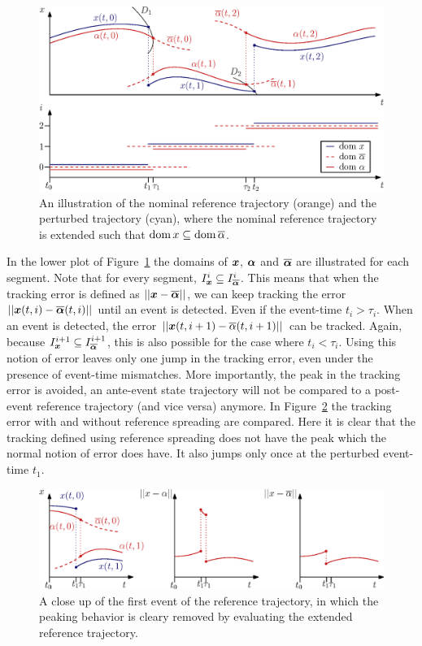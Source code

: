 \documentclass[../DC2017114Bouma.tex]{subfiles}
\begin{document}
\begin{figure}[h]
\centering
\includegraphics[width=.9\textwidth]{refspreaddom.eps}\caption{An illustration of the nominal reference trajectory (orange) and the perturbed trajectory (cyan), where the nominal reference trajectory is extended such that $\operatorname{\textnormal{dom}} x\subseteq\operatorname{\textnormal{dom}} \overline{\alpha}$.} \label{fig:3refspread}
\end{figure}

In the lower plot of Figure~\ref{fig:3refspread} the domains of ${\boldsymbol{x}}$, $\boldsymbol{\alpha}$ and $\overline{\boldsymbol{\alpha}}$ are illustrated for each segment. Note that for every segment, $I_{{\boldsymbol{x}}}^i\subseteq I_{\overline{\boldsymbol{\alpha}}}^i$. This means that when the tracking error is defined as $||{\boldsymbol{x}}-\overline{\boldsymbol{\alpha}}||$, we can keep tracking the error $||{\boldsymbol{x}}(t,i)-\overline{\boldsymbol{\alpha}}(t,i)||$ until an event is detected. Even if the event-time $t_i>\tau_i$. When an event is detected, the error  $||{\boldsymbol{x}}(t,i+1)-\overline{\alpha}(t,i+1)||$ can be tracked. Again, because $I_{{\boldsymbol{x}}}^{i+1}\subseteq I_{\overline{\boldsymbol{\alpha}}}^{i+1}$, this is also possible for the case where $t_i<\tau_i$. Using this notion of error leaves only one jump in the tracking error, even under the presence of event-time mismatches. More importantly, the peak in the tracking error is avoided, an ante-event state trajectory will not be compared to a post-event reference trajectory (and vice versa) anymore. In Figure~\ref{fig:3refspreaderrors} the tracking error with and without reference spreading are compared. Here it is clear that the tracking defined using reference spreading does not have the peak which the normal notion of error does have. It also jumps only once at the perturbed event-time $t_1$.
\begin{figure}[h]
\centering
\includegraphics[width=\textwidth]{refspreaderrors.eps}\caption{A close up of the  first event of the reference trajectory, in which the peaking behavior is cleary removed by evaluating the extended reference trajectory.} \label{fig:3refspreaderrors}
\end{figure}
\end{document}
